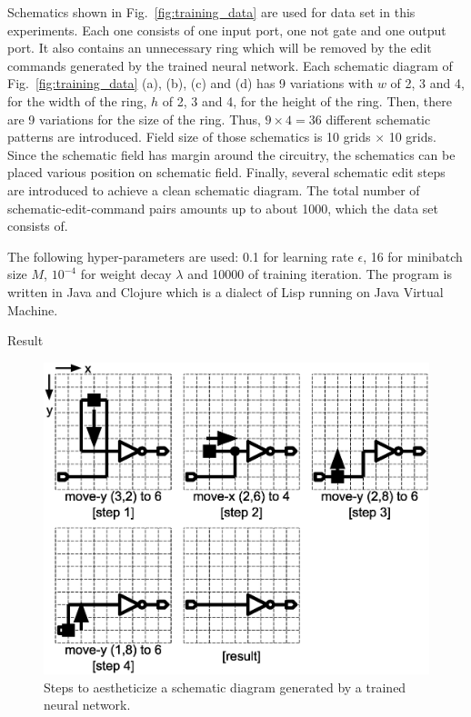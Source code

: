 \documentclass[twocolumn]{article}
\makeatletter
\def\section{\@startsection {section}{1}{\z@}{20pt plus 2pt minus 2pt}
{8pt plus 2pt minus 2pt}{\centering\normalsize\sc
\edef\@svsec{\thesection.\ }}}
\def\thesection{\Roman{section}}
\makeatother
\begin{document}
Schematics shown in Fig.\ \ref{fig:training_data} are used for data set
in this experiments.
Each one consists of one input port, one not gate and one output port.
It also contains an unnecessary ring which will be removed
by the edit commands generated by the trained neural network.
Each schematic diagram of Fig.\ \ref{fig:training_data} (a), (b), (c) and (d)
has 9 variations with
$w$ of 2, 3 and 4, for the width of the ring,
$h$ of 2, 3 and 4, for the height of the ring.
Then, there are 9 variations for the size of the ring.
Thus, $9 \times 4 = 36$ different schematic patterns are introduced.
Field size of those schematics is 10 grids $\times$ 10 grids.
Since the schematic field has margin around the circuitry,
the schematics can be placed various position on schematic field.
Finally, several schematic edit steps are introduced
to achieve a clean schematic diagram.
The total number of schematic-edit-command pairs amounts up to about 1000,
which the data set consists of.

The following hyper-parameters are used:
0.1 for learning rate $\epsilon$,
16 for minibatch size $M$,
$10^{-4}$ for weight decay $\lambda$ and 10000 of training iteration.
The program is written in Java and Clojure which is
a dialect of Lisp running on Java Virtual Machine.

\section{Result}

\begin{figure}[!tp]
 \begin{center}
  \begin{minipage}{\hsize}
   \includegraphics[width=\hsize]{fig/edit_steps_04.eps}
   \caption{Steps to aestheticize a schematic diagram
            generated by a trained neural network.}
   \label{fig:edit_steps}
  \end{minipage}
 \end{center}
\end{figure}
\end{document}
